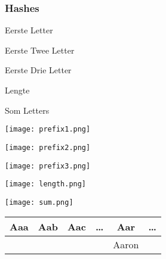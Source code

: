 \documentclass[dutch]{ucll-slides}
\begin{document}
\begin{frame}
  \frametitle{Hashes}
  \vskip2mm
  \begin{overprint}
    \begin{center}
      Eerste Letter
    \end{center}
    \begin{center}
      Eerste Twee Letter
    \end{center}
    \begin{center}
      Eerste Drie Letter
    \end{center}
    \begin{center}
      Lengte
    \end{center}
    \begin{center}
      Som Letters
    \end{center}
  \end{overprint}

  \begin{overprint}
    \begin{center}
      \texttt{[image: prefix1.png]}
    \end{center}
    \begin{center}
      \texttt{[image: prefix2.png]}
    \end{center}
    \begin{center}
      \texttt{[image: prefix3.png]}
    \end{center}
    \begin{center}
      \texttt{[image: length.png]}
    \end{center}
    \begin{center}
      \texttt{[image: sum.png]}
    \end{center}
  \end{overprint}
  \vskip2mm
  \begin{overprint}
    \begin{center}
      \begin{tabular}{cccccc}
        \bfseries Aaa & \bfseries Aab & \bfseries Aac & \dots & \bfseries Aar & \dots \\
        \toprule
         & & & & Aaron \\
      \end{tabular}
    \end{center}


\end{overprint}
\end{frame}
\end{document}
